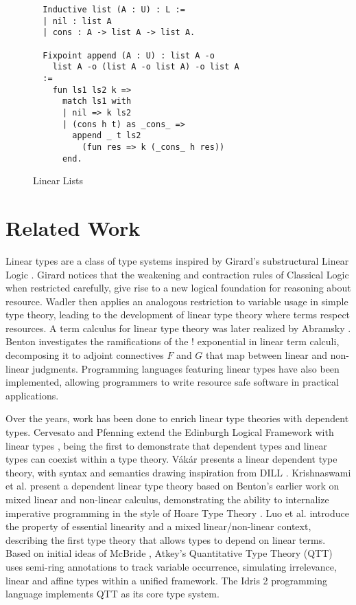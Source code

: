 \documentclass[sigplan,screen,review,anonymous]{acmart}
\begin{document}
\begin{figure}[h]
  \caption{Linear Lists}
  \begin{verbatim}
  Inductive list (A : U) : L :=
  | nil : list A
  | cons : A -> list A -> list A.
  
  Fixpoint append (A : U) : list A -o 
    list A -o (list A -o list A) -o list A 
  :=
    fun ls1 ls2 k =>
      match ls1 with
      | nil => k ls2
      | (cons h t) as _cons_ =>
        append _ t ls2 
          (fun res => k (_cons_ h res))
      end.
  \end{verbatim}
  \label{list}
  \Description{}
\end{figure}

\section{Related Work}
Linear types are a class of type systems inspired by Girard's substructural Linear Logic \cite{girard}. Girard notices that the weakening and contraction rules of Classical Logic when restricted carefully, give rise to a new logical foundation for reasoning about resource. Wadler \cite{wadler1990,wadler1991} then applies an analogous restriction to variable usage in simple type theory, leading to the development of linear type theory where terms respect resources. A term calculus for linear type theory was later realized by Abramsky \cite{abramsky1993}. Benton \cite{benton1994} investigates the ramifications of the ! exponential in linear term calculi, decomposing it to adjoint connectives $F$ and $G$ that map between linear and non-linear judgments. Programming languages \cite{l3,ats,linear-haskell} featuring linear types have also been implemented, allowing programmers to write resource safe software in practical applications.

Over the years, work has been done to enrich linear type theories with dependent types. Cervesato and Pfenning extend the Edinburgh Logical Framework with linear types \cite{lf,llf}, being the first to demonstrate that dependent types and linear types can coexist within a type theory. V\'{a}k\'{a}r \cite{vakar14} presents a linear dependent type theory, with syntax and semantics drawing inspiration from DILL \cite{dill}.  Krishnaswami et al. present a dependent linear type theory \cite{neel15} based on Benton's earlier work on mixed linear and non-linear calculus, demonstrating the ability to internalize imperative programming in the style of Hoare Type Theory \cite{htt}. Luo et al. \cite{luo} introduce the property of essential linearity and a mixed linear/non-linear context, describing the first type theory that allows types to depend on linear terms. Based on initial ideas of McBride \cite{nothing}, Atkey's Quantitative Type Theory (QTT) \cite{qtt} uses semi-ring annotations to track variable occurrence, simulating irrelevance, linear and affine types within a unified framework. The Idris 2 programming language \cite{idris2} implements QTT as its core type system.
\end{document}
